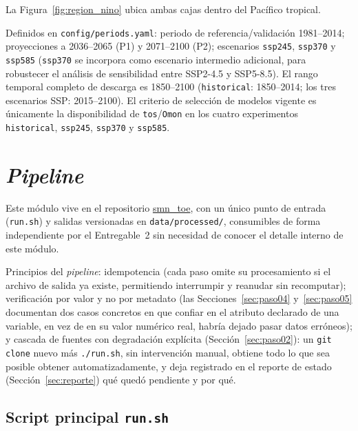 \documentclass[11pt,a4paper]{article}
\newcommand{\archivo}[1]{\begingroup\hypersetup{urlcolor=black}\url{#1}\endgroup}
\begin{document}
La Figura~\ref{fig:region_nino} ubica ambas cajas dentro del Pac\'ifico tropical.



Definidos en \texttt{config/periods.yaml}: periodo de referencia/validaci\'on 1981--2014; proyecciones a 2036--2065 (P1) y 2071--2100 (P2); escenarios \texttt{ssp245}, \texttt{ssp370} y \texttt{ssp585} (\texttt{ssp370} se incorpora como escenario intermedio adicional, para robustecer el an\'alisis de sensibilidad entre SSP2-4.5 y SSP5-8.5). El rango temporal completo de descarga es 1850--2100 (\texttt{historical}: 1850--2014; los tres escenarios SSP: 2015--2100). El criterio de selecci\'on de modelos vigente es \'unicamente la disponibilidad de \texttt{tos}/\texttt{Omon} en los cuatro experimentos \texttt{historical}, \texttt{ssp245}, \texttt{ssp370} y \texttt{ssp585}.

\section{\emph{Pipeline}}
\label{sec:arquitectura}

Este m\'odulo vive en el repositorio \archivo{smn_toe}, con un \'unico punto de entrada (\texttt{run.sh}) y salidas versionadas en \texttt{data/processed/}, consumibles de forma independiente por el Entregable~2 sin necesidad de conocer el detalle interno de este m\'odulo.

Principios del \emph{pipeline}: idempotencia (cada paso omite su procesamiento si el archivo de salida ya existe, permitiendo interrumpir y reanudar sin recomputar); verificaci\'on por valor y no por metadato (las Secciones~\ref{sec:paso04} y~\ref{sec:paso05} documentan dos casos concretos en que confiar en el atributo declarado de una variable, en vez de en su valor num\'erico real, habr\'ia dejado pasar datos err\'oneos); y cascada de fuentes con degradaci\'on expl\'icita (Secci\'on~\ref{sec:paso02}): un \texttt{git clone} nuevo m\'as \texttt{./run.sh}, sin intervenci\'on manual, obtiene todo lo que sea posible obtener automatizadamente, y deja registrado en el reporte de estado (Secci\'on~\ref{sec:reporte}) qu\'e qued\'o pendiente y por qu\'e.

\subsection{Script principal \texttt{run.sh}}
\label{sec:runsh}
\end{document}

